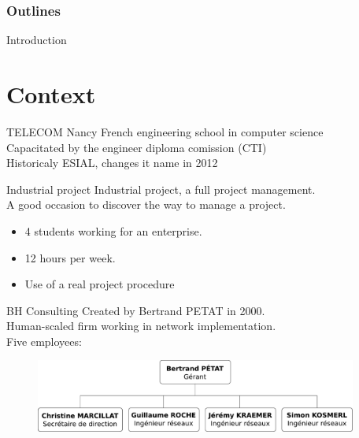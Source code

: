 \documentclass[12pt]{beamer}
\title{\titreA}
\subtitle{\titreB}
\author{Nicolas BOUGET, Julien GUEPIN, Marc PINHEDE, Julien VAUBOURG}
\institute{TELECOM Nancy}
\date{December 20, 2012}
\begin{document}
\begin{frame}
\titlepage
\end{frame}

\begin{frame}
    \frametitle{Outlines}
	\tableofcontents[pausesection]
\end{frame}

\begin{frame}{Introduction}
\end{frame}
    
\section{Context}

\begin{frame}{TELECOM Nancy}
    French engineering school in computer science\\
    \vfill
    Capacitated by the engineer diploma comission (CTI)\\
    \vfill
    Historicaly ESIAL, changes it name in 2012\\
    \vfill
\end{frame}



\begin{frame}{Industrial project}
    Industrial project, a full project management.\\
    \vfill
    A good occasion to discover the way to manage a project.
    \vfill
    \begin{itemize}
	\item 4 students working for an enterprise.
	\item 12 hours per week.
	\item Use of a real project procedure
    \end{itemize}
\end{frame}


    
\begin{frame}{BH Consulting}
    Created by Bertrand PETAT in 2000.\\
    \vfill
    Human-scaled firm working in network implementation.\\
    \vfill
    Five employees:
    \begin{figure}
	\includegraphics[width=300pt]{img/organigramme.pdf}
    \end{figure}
\end{frame}
\end{document}
